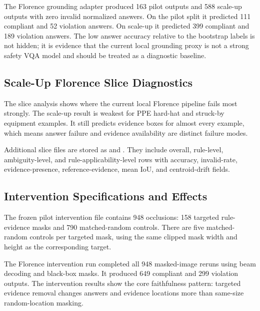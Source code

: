The Florence grounding adapter produced 163 pilot outputs and 588 scale-up outputs with zero invalid normalized answers. On the pilot split it predicted 111 compliant and 52 violation answers. On scale-up it predicted 399 compliant and 189 violation answers. The low answer accuracy relative to the bootstrap labels is not hidden; it is evidence that the current local grounding proxy is not a strong safety VQA model and should be treated as a diagnostic baseline.

\subsection{Scale-Up Florence Slice Diagnostics}

The slice analysis shows where the current local Florence pipeline fails most strongly. The scale-up result is weakest for PPE hard-hat and struck-by equipment examples. It still predicts evidence boxes for almost every example, which means answer failure and evidence availability are distinct failure modes.

\begin{table}[h]
\centering
\caption{Scale-up Florence rule slices.}

\end{table}

Additional slice files are stored as  and . They include overall, rule-level, ambiguity-level, and rule-applicability-level rows with accuracy, invalid-rate, evidence-presence, reference-evidence, mean IoU, and centroid-drift fields.

\subsection{Intervention Specifications and Effects}

The frozen pilot intervention file contains 948 occlusions: 158 targeted rule-evidence masks and 790 matched-random controls. There are five matched-random controls per targeted mask, using the same clipped mask width and height as the corresponding target.

\begin{table}[h]
\centering
\caption{Pilot intervention specification counts.}

\end{table}

The Florence intervention run completed all 948 masked-image reruns using beam decoding and black-box masks. It produced 649 compliant and 299 violation outputs. The intervention results show the core faithfulness pattern: targeted evidence removal changes answers and evidence locations more than same-size random-location masking.

